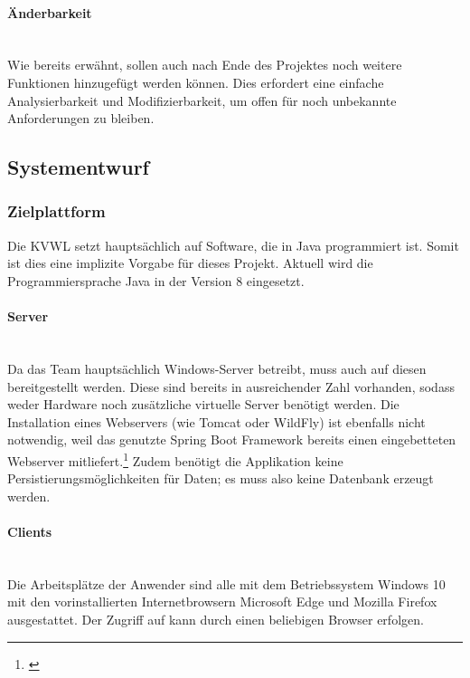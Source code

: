 \paragraph{Änderbarkeit} ~\\
\label{p:Aenderbarkeit}
Wie bereits erwähnt, sollen auch nach Ende des Projektes noch weitere Funktionen hinzugefügt werden können. Dies erfordert eine einfache Analysierbarkeit und Modifizierbarkeit, um offen für noch unbekannte Anforderungen zu bleiben.

\subsection{Systementwurf}
\label{sec:Systementwurf}

\subsubsection{Zielplattform}
\label{sec:Systementwurf}
Die \ac{KVWL} setzt hauptsächlich auf Software, die in Java programmiert ist. Somit ist dies eine implizite Vorgabe für dieses Projekt. Aktuell wird die Programmiersprache Java in der Version 8 eingesetzt.

\paragraph{Server} ~\\
\label{p:Server}
 Da das Team \teamName hauptsächlich Windows-Server betreibt, muss auch \projektName auf diesen bereitgestellt werden. Diese sind bereits in ausreichender Zahl vorhanden, sodass weder Hardware noch zusätzliche virtuelle Server benötigt werden. Die Installation eines Webservers (wie Tomcat oder WildFly) ist ebenfalls nicht notwendig, weil das genutzte Spring Boot Framework bereits einen eingebetteten Webserver mitliefert.\footnote{\Vgl \cite{spring:web}} Zudem benötigt die Applikation keine Persistierungsmöglichkeiten für Daten; es muss also keine Datenbank erzeugt werden.
 
\paragraph{Clients} ~\\
\label{p:Clients}
 Die Arbeitsplätze der Anwender sind alle mit dem Betriebssystem Windows 10 mit den vorinstallierten Internetbrowsern Microsoft Edge und Mozilla Firefox ausgestattet. Der Zugriff auf \projektName kann durch einen beliebigen Browser erfolgen.

